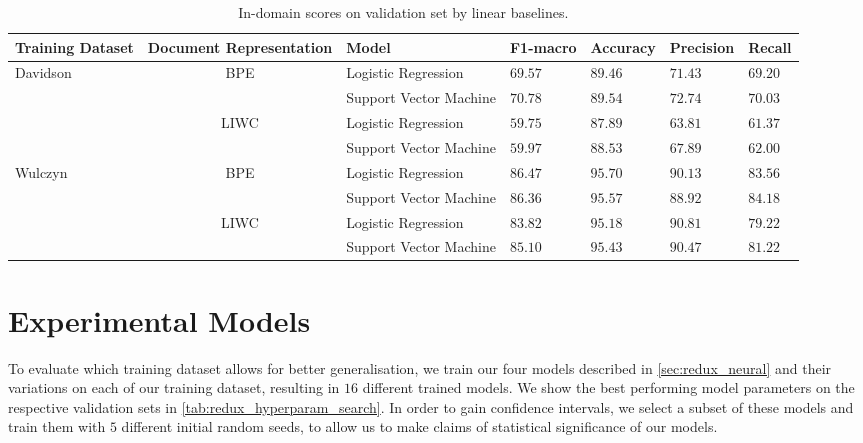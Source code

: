 \begin{landscape}
\begin{table}[]
\centering
\begin{tabular}{l|clllll}
Training Dataset          & Document Representation                     & Model                   & F1-macro & Accuracy & Precision & Recall   \\ \hline
\multirow{4}{*}{Davidson} & \multirow{2}{*}{BPE}                        & Logistic Regression     & $69.57$  & $89.46$  & $71.43$   & $69.20$  \\
                          &                                             & Support Vector Machine  & $70.78$  & $89.54$  & $72.74$   & $70.03$  \\
                          & \multirow{2}{*}{LIWC}                       & Logistic Regression     & $59.75$  & $87.89$  & $63.81$   & $61.37$  \\
                          &                                             & Support Vector Machine  & $59.97$  & $88.53$  & $67.89$   & $62.00$  \\
\multirow{4}{*}{Wulczyn}  & \multirow{2}{*}{BPE}                        & Logistic Regression     & $86.47$  & $95.70$  & $90.13$   & $83.56$  \\
                          &                                             & Support Vector Machine  & $86.36$  & $95.57$  & $88.92$   & $84.18$  \\
                          & \multirow{2}{*}{LIWC}                       & Logistic Regression     & $83.82$  & $95.18$  & $90.81$   & $79.22$  \\
                          &                                             & Support Vector Machine  & $85.10$  & $95.43$  & $90.47$   & $81.22$
\end{tabular}
\caption{In-domain scores on validation set by linear baselines.}
\label{tab:redux_linear_baselines_dev}
\end{table}
\end{landscape}

\section{Experimental Models}

To evaluate which training dataset allows for better generalisation, we train our four models described in \autoref{sec:redux_neural} and their variations on each of our training dataset, resulting in $16$ different trained models. We show the best performing model parameters on the respective validation sets in \autoref{tab:redux_hyperparam_search}. In order to gain confidence intervals, we select a subset of these models and train them with $5$ different initial random seeds, to allow us to make claims of statistical significance of our models.

